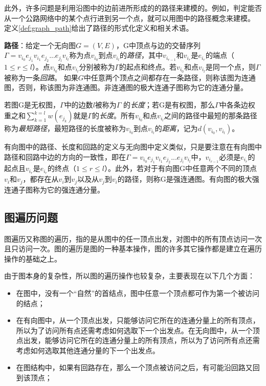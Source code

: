 此外，许多问题是利用沿图中的边前进所形成的的路径来建模的。例如，判定能否从一个公路网络中的某个点行进到另一个点，就可以用图中的路径概念来建模。
定义\ref{def:graph_path}给出了路径的形式化定义和相关术语。
\begin{definition}
\label{def:graph_path}
\textbf{路径}：给定一个无向图$G=(V,E)$，G中顶点与边的交替序列$\Gamma = v_{i_0}e_{j_1}v_{i_1}e_{j_2}...e_{j_l}v_{i_l}$称为点$v_{i_0}$到点$v_{i_l}$的\emph{路径}，其中$v_{i_{r-1}}$和$v_{i_{r}}$是$e_{i_r}$的端点（$1\le r\le l$）。点$v_{i_0}$和点$v_{i_l}$分别被称为$\Gamma$的起点和终点。若$v_{i_0}$和点$v_{i_l}$是同一个点，则$\Gamma$被称为一条\emph{回路}。
如果$G$中任意两个顶点之间都存在一条路径，则称该图为连通图，否则，称该图为非连通图。非连通图的极大连通子图称为它的连通分量。

若图G是无权图，$\Gamma$中的边数$l$被称为$\Gamma$ 的\emph{长度}；若G是有权图，那么$\Gamma$中各条边权重之和$\sum_{k=1}^{k=l} w(e_{j_k})$就是$\Gamma$的\emph{长度}。所有$v_{i_0}$和点$v_{i_l}$之间的路径中最短的那条路径称为\emph{最短路径}，最短路径的长度被称为$v_{i_0}$到点$v_{i_l}$的\emph{距离}，记为$d(v_{i_0},v_{i_l})$。

有向图中的路径、长度和回路的定义与无向图中定义类似，只是要注意在有向图中路径和回路中边的方向的一致性，即在$\Gamma = v_{i_0}e_{j_1}v_{i_1}e_{j_2}...e_{j_l}v_{i_l}$中，$v_{i_{r-1}}$必须是$e_{i_r}$的起点且$v_{i_{r}}$是$e_{i_r}$的终点（$1\le r\le l$）。此外，若对于有向图G中任意两个不同的顶点$v_i$和$v_j$，都存在从$v_i$到$v_j$以及从$v_j$到$v_i$的路径，则称G是强连通图。有向图的极大强连通子图称为它的强连通分量。
\end{definition}

\subsection{图遍历问题}
图遍历又称图的遍历，指的是从图中的任一顶点出发，对图中的所有顶点访问一次且只访问一次。图的遍历是图的一种基本操作，图的许多其它操作都是建立在遍历操作的基础之上。



由于图本身的复杂性，所以图的遍历操作也较复杂，主要表现在以下几个方面：


\begin{itemize}
  \item 在图中，没有一个“自然”的首结点，图中任意一个顶点都可作为第一个被访问的结点；
  \item 在有向图中，从一个顶点出发，只能够访问它所在的连通分量上的所有顶点，所以为了访问所有点还需考虑如何选取下一个出发点。在无向图中，从一个顶点出发，能够访问它所在的连通分量上的所有顶点，所以为了访问所有点还需考虑如何选取其他连通分量的下一个出发点。
  \item 在图结构中，如果有回路存在，那么一个顶点被访问之后，有可能沿回路又回到该顶点；
\end{itemize}

